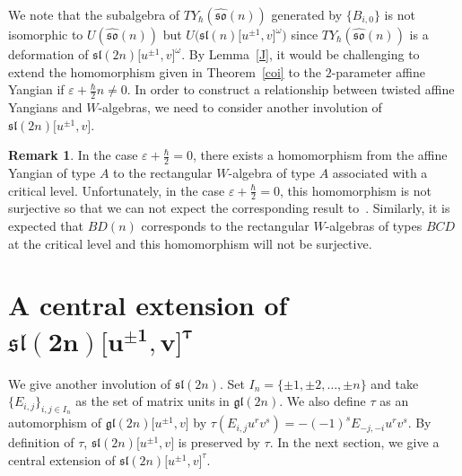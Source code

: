 \documentclass[pdftex]{sigma}
\numberwithin{equation}{section}
\theoremstyle{definition}
\newtheorem{Remark}[Theorem]{Remark}
\newcommand{\ve}{\varepsilon}
\begin{document}
We note that the subalgebra of $TY_{\hbar}(\widehat{\mathfrak{so}}(n))$ generated by $\{B_{i,0}\}$ is not isomorphic to $U(\widehat{\mathfrak{so}}(n))$ but $U\bigl(\mathfrak{sl}(n)\bigl[u^{\pm1},v\bigr]^\omega\bigr)$ since $TY_{\hbar}(\widehat{\mathfrak{so}}(n))$ is a deformation of $\mathfrak{sl}(2n)\bigl[u^{\pm1},v\bigr]^\omega$. By Lemma~\ref{J}, it would be challenging to extend the homomorphism given in Theorem~\ref{coi} to the $2$-parameter affine Yangian if $\ve+\frac{\hbar}{2}n\neq0$. In order to construct a relationship between twisted affine Yangians and $W$-algebras, we need to consider another involution of $\mathfrak{sl}(2n)\bigl[u^{\pm1},v\bigr]$.
\begin{Remark}
In the case $\ve+\frac{\hbar}{2}=0$, there exists a homomorphism from the affine Yangian of type $A$ to the rectangular $W$-algebra of type $A$ associated with a critical level. Unfortunately, in the case $\ve+\frac{\hbar}{2}=0$, this homomorphism is not surjective so that we can not expect the corresponding result to~\cite{BK}. Similarly, it is expected that $BD(n)$ corresponds to the rectangular $W$-algebras of types $BCD$ at the critical level and this homomorphism will not be surjective.
\end{Remark}
\section[A central extension of sl(2n){[u\^{}\{pm1\},v]}\^{}tau]{A central extension of $\boldsymbol{\mathfrak{sl}(2n)\bigl[u^{\pm1},v\bigr]^\tau}$}\label{sec:5}
We give another involution of $\mathfrak{sl}(2n)$. Set $I_n=\{\pm1,\pm2,\dots,\pm n\}$ and take $\{E_{i,j}\}_{i,j\in I_n}$ as the set of matrix units in $\mathfrak{gl}(2n)$. We also define $\tau$ as an automorphism of $\mathfrak{gl}(2n)\bigl[u^{\pm1},v\bigr]$ by $\tau(E_{i,j}u^rv^s)=-(-1)^sE_{-j,-i}u^rv^s$. By definition of $\tau$, $\mathfrak{sl}(2n)\bigl[u^{\pm1},v\bigr]$ is preserved by $\tau$. In the next section, we give a central extension of $\mathfrak{sl}(2n)\bigl[u^{\pm1},v\bigr]^\tau$.
\end{document}
